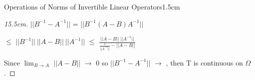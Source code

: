 \begin{ltheorem}{Operations of Norms of Invertible Linear Operators}{1.5cm}
\begin{proof}[15.5cm]
                \hspace{0.5cm}
                $||B^{-1} - A^{-1}||$
                = $||B^{-1}(A - B)A^{-1}||$

                \hspace{3.1cm}
                $\leq$ $||B^{-1}|| \ ||A - B|| \ ||A^{-1}||$
                $\leq$ $\frac{||A - B|| \ ||A^{-1}||}
                            {\frac{1}{||A^{-1}||} - ||A-B||}$

                Since $\lim_{B \rightarrow A}$ $||A-B||$ $\rightarrow$ 0
                so $||B^{-1} - A^{-1}||$ $\rightarrow$ , then
                T is continuous on $\Omega$.
            \end{proof}
    \end{ltheorem}

    \newpage




